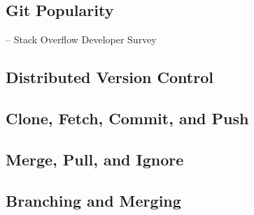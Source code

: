 \subsection{Git Popularity}
\begin{frame}{\insertsubsection{} -- Stack Overflow Developer Survey}
\end{frame}



\subsection{Distributed Version Control}
\begin{frame}{\insertsubsection}
	\slideDistributedVC
\end{frame}


\subsection{Clone, Fetch, Commit, and Push}
\slideCloneFetch

\slideCommitPush



\subsection{Merge, Pull, and Ignore}
\slideMergePull

\slideIgnore

\subsection{Branching and Merging}
\begin{frame}{\insertsubsection}
	\slideBranchingAndMerging
\end{frame}

